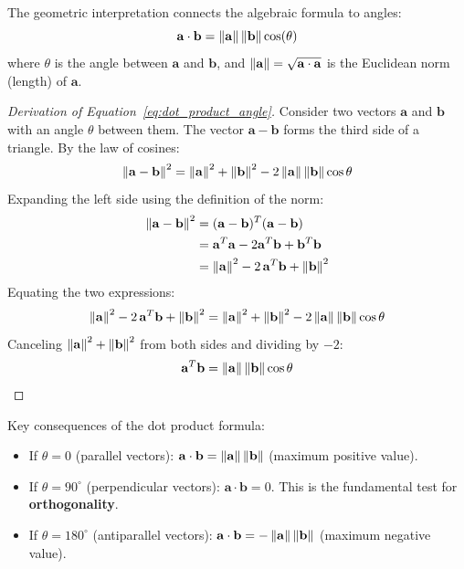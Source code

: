 The geometric interpretation connects the algebraic formula to angles:
\begin{equation}
\label{eq:dot_product_angle}
   \mathbf{a} \cdot \mathbf{b} = \left\lVert \mathbf{a} \right\rVert\left\lVert \mathbf{b} \right\rVert\cos(\theta)
\end{equation}
where $\theta$ is the angle between $\mathbf{a}$ and $\mathbf{b}$, and $\left\lVert \mathbf{a} \right\rVert = \sqrt{\mathbf{a} \cdot \mathbf{a}}$ is the Euclidean norm (length) of $\mathbf{a}$.

\begin{proof}[Derivation of Equation~\eqref{eq:dot_product_angle}]
Consider two vectors $\mathbf{a}$ and $\mathbf{b}$ with an angle $\theta$ between them. The vector $\mathbf{a} - \mathbf{b}$ forms the third side of a triangle. By the law of cosines:
\begin{equation}
    \left\lVert \mathbf{a} - \mathbf{b} \right\rVert^2 = \left\lVert \mathbf{a} \right\rVert^2 + \left\lVert \mathbf{b} \right\rVert^2 - 2\left\lVert \mathbf{a} \right\rVert\left\lVert \mathbf{b} \right\rVert\cos\theta
\end{equation}
Expanding the left side using the definition of the norm:
\begin{align}
    \left\lVert \mathbf{a} - \mathbf{b} \right\rVert^2 &= (\mathbf{a} - \mathbf{b})^T(\mathbf{a} - \mathbf{b}) \\
    &= \mathbf{a}^T\mathbf{a} - 2\mathbf{a}^T\mathbf{b} + \mathbf{b}^T\mathbf{b} \\
    &= \left\lVert \mathbf{a} \right\rVert^2 - 2\,\mathbf{a}^T\mathbf{b} + \left\lVert \mathbf{b} \right\rVert^2
\end{align}
Equating the two expressions:
\begin{equation}
    \left\lVert \mathbf{a} \right\rVert^2 - 2\,\mathbf{a}^T\mathbf{b} + \left\lVert \mathbf{b} \right\rVert^2 = \left\lVert \mathbf{a} \right\rVert^2 + \left\lVert \mathbf{b} \right\rVert^2 - 2\left\lVert \mathbf{a} \right\rVert\left\lVert \mathbf{b} \right\rVert\cos\theta
\end{equation}
Canceling $\left\lVert \mathbf{a} \right\rVert^2 + \left\lVert \mathbf{b} \right\rVert^2$ from both sides and dividing by $-2$:
\begin{equation}
    \mathbf{a}^T\mathbf{b} = \left\lVert \mathbf{a} \right\rVert\left\lVert \mathbf{b} \right\rVert\cos\theta
\end{equation}
\end{proof}

Key consequences of the dot product formula:
\begin{itemize}
    \item If $\theta = 0$ (parallel vectors): $\mathbf{a} \cdot \mathbf{b} = \left\lVert \mathbf{a} \right\rVert\left\lVert \mathbf{b} \right\rVert$ (maximum positive value).
    \item If $\theta = 90^\circ$ (perpendicular vectors): $\mathbf{a} \cdot \mathbf{b} = 0$. This is the fundamental test for \textbf{orthogonality}.
    \item If $\theta = 180^\circ$ (antiparallel vectors): $\mathbf{a} \cdot \mathbf{b} = -\left\lVert \mathbf{a} \right\rVert\left\lVert \mathbf{b} \right\rVert$ (maximum negative value).
\end{itemize}


